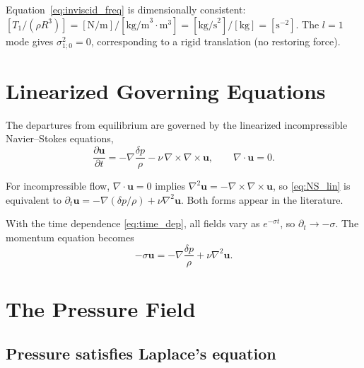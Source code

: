 \documentclass[12pt]{article}
\newcommand{\bu}{\bm{u}}
\theoremstyle{definition}
\begin{document}
\begin{notebox}
Equation~\eqref{eq:inviscid_freq} is dimensionally consistent:
$[T_1/(\rho R^3)] = [\text{N/m}]/[\text{kg/m}^3 \cdot \text{m}^3]
 = [\text{kg/s}^2]/[\text{kg}] = [\text{s}^{-2}]$. The $l=1$ mode gives
$\sigma_{1;0}^2 = 0$, corresponding to a rigid translation (no restoring force).
\end{notebox}

\section{Linearized Governing Equations}

The departures from equilibrium are governed by the linearized incompressible
Navier--Stokes equations,
\begin{equation}
  \frac{\partial\bu}{\partial t} = -\nabla\frac{\delta p}{\rho}
                                    - \nu\,\nabla\times\nabla\times\bu,
  \qquad
  \nabla\cdot\bu = 0.
  \label{eq:NS_lin}
\end{equation}

\begin{notebox}
For incompressible flow, $\nabla\cdot\bu = 0$ implies
$\nabla^2\bu = -\nabla\times\nabla\times\bu$, so
\eqref{eq:NS_lin} is equivalent to
$\partial_t\bu = -\nabla(\delta p/\rho) + \nu\nabla^2\bu$.
Both forms appear in the literature.
\end{notebox}

With the time dependence \eqref{eq:time_dep}, all fields vary as $e^{-\sigma t}$,
so $\partial_t \to -\sigma$. The momentum equation becomes
\begin{equation}
  -\sigma\bu = -\nabla\frac{\delta p}{\rho} + \nu\nabla^2\bu.
  \label{eq:NS_sigma}
\end{equation}

\section{The Pressure Field}

\subsection{Pressure satisfies Laplace's equation}
\end{document}
